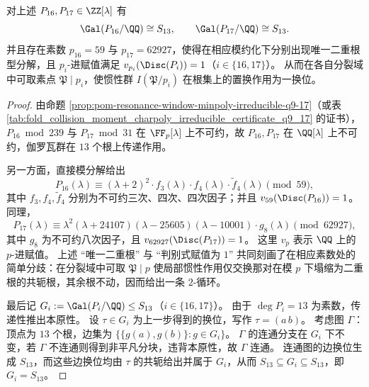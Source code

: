 \begin{theorem}[共振窗 \texorpdfstring{$q=16,17$}{q=16,17} 的满对称伽罗瓦群与换位惯性]\label{thm:pom-resonance-galois-s13-q16-17}
对上述 \(P_{16},P_{17}\in\ZZ[\lambda]\) 有
\[
\Gal(P_{16}/\QQ)\cong S_{13},\qquad \Gal(P_{17}/\QQ)\cong S_{13}.
\]
并且存在素数 \(p_{16}=59\) 与 \(p_{17}=62927\)，使得在相应模约化下分别出现唯一二重根型分解，且 \(p_i\)-进赋值满足 \(v_{p_i}(\Disc(P_i))=1\)（\(i\in\{16,17\}\)）。
从而在各自分裂域中可取素点 \(\mathfrak P\mid p_i\)，使惯性群 \(I(\mathfrak P/p_i)\) 在根集上的置换作用为一换位。
\end{theorem}
\begin{proof}
由命题 \ref{prop:pom-resonance-window-minpoly-irreducible-q9-17}（或表 \ref{tab:fold_collision_moment_charpoly_irreducible_certificate_q9_17} 的证书），
\(P_{16}\bmod 239\) 与 \(P_{17}\bmod 31\) 在 \(\FF_p[\lambda]\) 上不可约，故 \(P_{16},P_{17}\) 在 \(\QQ[\lambda]\) 上不可约，伽罗瓦群在 \(13\) 个根上传递作用。

另一方面，直接模分解给出
\[
P_{16}(\lambda)\equiv (\lambda+2)^2\cdot f_3(\lambda)\cdot f_4(\lambda)\cdot \widetilde f_4(\lambda)\pmod{59},
\]
其中 \(f_3,f_4,\widetilde f_4\) 分别为不可约三次、四次、四次因子；并且 \(v_{59}(\Disc(P_{16}))=1\)。
同理，
\[
P_{17}(\lambda)\equiv \lambda^2(\lambda+24107)(\lambda-25605)(\lambda-10001)\cdot g_8(\lambda)\pmod{62927},
\]
其中 \(g_8\) 为不可约八次因子，且 \(v_{62927}(\Disc(P_{17}))=1\)。
这里 \(v_p\) 表示 \(\QQ\) 上的 \(p\)-进赋值。
上述 ``唯一二重根'' 与 ``判别式赋值为 \(1\)'' 共同刻画了在相应素数处的简单分歧：在分裂域中可取 \(\mathfrak P\mid p\) 使局部惯性作用仅交换那对在模 \(p\) 下塌缩为二重根的共轭根，其余根不动，因而给出一条 \(2\)-循环。

最后记 \(G_i:=\Gal(P_i/\QQ)\le S_{13}\)（\(i\in\{16,17\}\)）。
由于 \(\deg P_i=13\) 为素数，传递性推出本原性。
设 \(\tau\in G_i\) 为上一步得到的换位，写作 \(\tau=(a\,b)\)。
考虑图 \(\Gamma\)：顶点为 \(13\) 个根，边集为 \(\{\{g(a),g(b)\}: g\in G_i\}\)。
\(\Gamma\) 的连通分支在 \(G_i\) 下不变，若 \(\Gamma\) 不连通则得到非平凡分块，违背本原性，故 \(\Gamma\) 连通。
连通图的边换位生成 \(S_{13}\)，而这些边换位均由 \(\tau\) 的共轭给出并属于 \(G_i\)，从而 \(S_{13}\subseteq G_i\subseteq S_{13}\)，即 \(G_i=S_{13}\)。
\end{proof}

